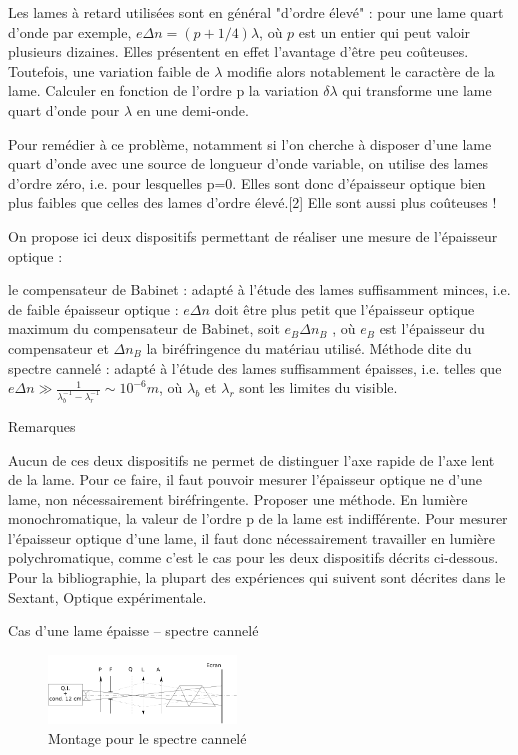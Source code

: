 \documentclass{article}%
\begin{document}
Les lames à retard utilisées sont en général "d'ordre élevé" : pour une lame quart d'onde par exemple, $e \Delta n = (p+1/4)\lambda$, où $p$ est un entier qui peut valoir plusieurs dizaines. Elles présentent en effet l'avantage d'être peu coûteuses. Toutefois, une variation faible de $\lambda$ modifie alors notablement le caractère de la lame. Calculer en fonction de l'ordre p la variation $\delta \lambda$ qui transforme une lame quart d'onde pour $\lambda$ en une demi-onde.

Pour remédier à ce problème, notamment si l'on cherche à disposer d'une lame quart d'onde avec une source de longueur d'onde variable, on utilise des lames d'ordre zéro, i.e. pour lesquelles p=0. Elles sont donc d'épaisseur optique bien plus faibles que celles des lames d'ordre élevé.[2] Elle sont aussi plus coûteuses !

On propose ici deux dispositifs permettant de réaliser une mesure de l'épaisseur optique :

    le compensateur de Babinet : adapté à l'étude des lames suffisamment minces, i.e. de faible épaisseur optique : $e\Delta n$ doit être plus petit que l'épaisseur optique maximum du compensateur de Babinet, soit $e_{B}\Delta n_B$ , où $e_B$ est l'épaisseur du compensateur et $\Delta n_B$ la biréfringence du matériau utilisé.
    Méthode dite du spectre cannelé : adapté à l'étude des lames suffisamment épaisses, i.e. telles que $e \Delta n \gg \frac{1}{\lambda_b^{-1}-\lambda_r^{-1}}\sim 10^{-6}m$, où $\lambda_b$ et $\lambda_r$ sont les limites du visible.

Remarques

    Aucun de ces deux dispositifs ne permet de distinguer l'axe rapide de l'axe lent de la lame. Pour ce faire, il faut pouvoir mesurer l'épaisseur optique ne d'une lame, non nécessairement biréfringente. Proposer une méthode.
    En lumière monochromatique, la valeur de l'ordre p de la lame est indifférente. Pour mesurer l'épaisseur optique d'une lame, il faut donc nécessairement travailler en lumière polychromatique, comme c'est le cas pour les deux dispositifs décrits ci-dessous.
    Pour la bibliographie, la plupart des expériences qui suivent sont décrites dans le Sextant, Optique expérimentale.

Cas d'une lame épaisse -- spectre cannelé
\begin{figure}
	\centerline{\includegraphics[width=5cm]{images-exp/spectrecannele.png}}
	\caption{Montage pour le spectre cannelé}
\end{figure}
\end{document}
